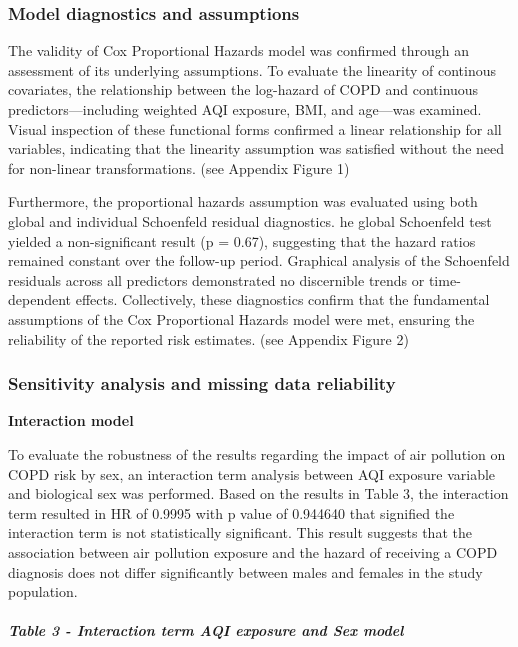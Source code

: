 \documentclass[
]{article}
\begin{document}
\subsubsection{Model diagnostics and
assumptions}\label{model-diagnostics-and-assumptions}

The validity of Cox Proportional Hazards model was confirmed through an
assessment of its underlying assumptions. To evaluate the linearity of
continous covariates, the relationship between the log-hazard of COPD
and continuous predictors---including weighted AQI exposure, BMI, and
age---was examined. Visual inspection of these functional forms
confirmed a linear relationship for all variables, indicating that the
linearity assumption was satisfied without the need for non-linear
transformations. (see Appendix Figure 1)

Furthermore, the proportional hazards assumption was evaluated using
both global and individual Schoenfeld residual diagnostics. he global
Schoenfeld test yielded a non-significant result (p = 0.67), suggesting
that the hazard ratios remained constant over the follow-up period.
Graphical analysis of the Schoenfeld residuals across all predictors
demonstrated no discernible trends or time-dependent effects.
Collectively, these diagnostics confirm that the fundamental assumptions
of the Cox Proportional Hazards model were met, ensuring the reliability
of the reported risk estimates. (see Appendix Figure 2)

\subsubsection{Sensitivity analysis and missing data
reliability}\label{sensitivity-analysis-and-missing-data-reliability}

\textbf{Interaction model}

To evaluate the robustness of the results regarding the impact of air
pollution on COPD risk by sex, an interaction term analysis between AQI
exposure variable and biological sex was performed. Based on the results
in Table 3, the interaction term resulted in HR of 0.9995 with p value
of 0.944640 that signified the interaction term is not statistically
significant. This result suggests that the association between air
pollution exposure and the hazard of receiving a COPD diagnosis does not
differ significantly between males and females in the study population.

\paragraph{\texorpdfstring{\emph{Table 3 - Interaction term AQI exposure
and Sex
model}}{Table 3 - Interaction term AQI exposure and Sex model}}\label{table-3---interaction-term-aqi-exposure-and-sex-model}
\end{document}
